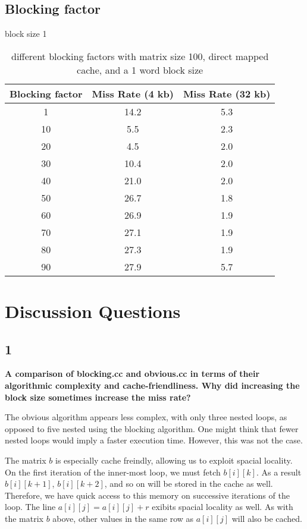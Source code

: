 \documentclass[letterpaper, 12pt, oneside]{memoir}
\begin{document}
\subsection{Blocking factor}
block size 1

\begin{table}[H]
\centering
\begin{tabular}{c|c|c}
    Blocking factor & Miss Rate (4 kb) & Miss Rate (32 kb) \\ \hline
    1   & 14.2  & 5.3 \\
    10  & 5.5   & 2.3 \\
    20  & 4.5   & 2.0 \\
    30  & 10.4  & 2.0 \\
    40  & 21.0  & 2.0 \\
    50  & 26.7  & 1.8 \\
    60  & 26.9  & 1.9 \\
    70  & 27.1  & 1.9 \\
    80  & 27.3  & 1.9 \\
    90  & 27.9  & 5.7 \\
\end{tabular}
\caption{different blocking factors with matrix size 100, direct mapped cache, and a 1 word block size}
\end{table}

\section{Discussion Questions}


\subsection{1}
\textbf{A comparison of blocking.cc and obvious.cc in terms of their algorithmic 
complexity and cache-friendliness. Why did increasing the block size sometimes 
increase the miss rate?}

The obvious algorithm appears less complex, with only three nested loops, as
opposed to five nested using the blocking algorithm. One might think that
fewer nested loops would imply a faster execution time. However, this was
not the case.

The matrix $b$ is especially cache freindly, allowing us to exploit spacial
locality. On the first iteration of the inner-most loop, we must fetch
$b[i][k]$. As a result $b[i][k+1]$, $b[i][k+2]$, and so on will be stored in 
the cache as well. Therefore, we have quick access to this memory on successive
iterations of the loop. The line $ a[i][j] = a[i][j] + r$  exibits spacial
locality as well. As with the matrix $b$ above, other values in the same row 
as $a[i][j]$ will also be cached. 
\end{document}
